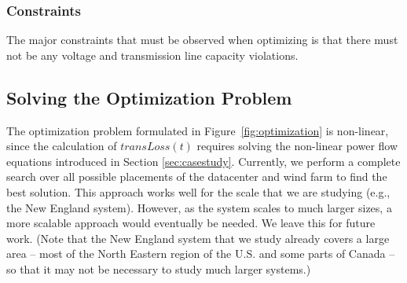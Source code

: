 

\subsubsection{Constraints}
The major constraints that must be observed when optimizing is that
there must not be any voltage and transmission line capacity
violations.



\subsection{Solving the Optimization Problem}

The optimization problem formulated in Figure~\ref{fig:optimization} is non-linear, since the calculation of $transLoss(t)$ requires solving the non-linear power flow equations introduced in Section \ref{sec:casestudy}.  Currently, we perform a complete search over all possible placements of the datacenter and wind farm to find the best solution.  This approach works well for the scale that we are studying (e.g., the New England system).  However, as the system scales to much larger sizes, a more scalable approach would eventually be needed.  We leave this for future work.  (Note that the New England system that we study already covers a large area -- most of the North Eastern region of the U.S. and some parts of Canada -- so that it may not be necessary to study much larger systems.)

